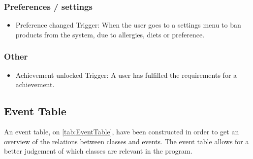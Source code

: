 \subsubsection{Preferences / settings}
\begin{itemize}
\item Preference changed
    \subitem Trigger: When the user goes to a settings menu to ban products from the system, due to allergies, diets or preference.
\end{itemize}


\subsubsection{Other}
\begin{itemize}
\item Achievement unlocked
    \subitem Trigger: A user has fulfilled the requirements for a achievement.
\end{itemize}

\subsection{Event Table}
An event table, on \cref{tab:EventTable},  have been constructed in order to get an overview of the relations between classes and events. The event table allows for a better judgement of which classes are relevant in the program.

